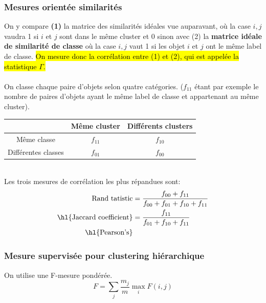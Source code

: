 \documentclass[letterpaper, 12pt]{article}
\newcommand{\alinea}{
\hspace*{0.5cm}}
\begin{document}
			\subsubsection{Mesures orientée similarités}
				\alinea On y compare \textbf{(1)} 
					la matrice des similarités idéales
					vue auparavant, où la case $i, j$ 
					vaudra 1 si $i$ et $j$ sont dans le
					même cluster et 0 sinon avec (2) la \textbf{matrice
					idéale de similarité de classe} où la case
					$i, j$ vaut 1 si les objet $i$ et $j$ ont
					le même label de classe. \hl{On mesure donc la 
					corrélation entre (1) et (2), qui est appelée 
					la statistique $\Gamma$.}\\
				~\\
				On classe chaque paire d'objets selon quatre catégories.
				($f_{11}$ étant par exemple le nombre de paires d'objets
				ayant le même label de classe et appartenant au même 
				cluster).\\
				\begin{center}
				\begin{tabular}{|c|c|c|}
				\hline
				                    & Même cluster & Différents clusters\\
				\hline
				Même classe         &    $f_{11}$  &       $f_{10}$     \\
				\hline				
				Différentes classes &    $f_{01}$  &       $f_{00}$     \\
				\hline
				\end{tabular}
				\end{center}~\\
				Les trois mesures de corrélation les plus répandues sont:
				\begin{align*}
					\text{Rand tatistic} &= \frac{f_{00} + f_{11}}%
						{f_{00} + f_{01} + f_{10} + f_{11}}\\
					\text{\hl{Jaccard coefficient}} &= \frac{f_{11}}{f_{01} + 
						f_{10} + f_{11}}\\
					\text{\hl{Pearson's}}
				\end{align*}
			\subsubsection{Mesure supervisée pour clustering hiérarchique}
				\alinea On utilise une F-mesure pondérée.
				$$ F = \sum_{j} \frac{m_j}{m} \max_{i} F(i, j) $$
\end{document}
